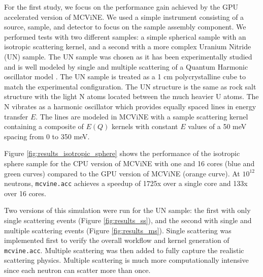 For the first study, we focus on the performance gain achieved by the GPU accelerated version of MCViNE.
We used a simple instrument consisting of a source, sample, and detector to focus on the sample assembly component. 
We performed tests with two different samples: a simple spherical sample with an isotropic scattering kernel, and a second with a more complex Uranium Nitride (UN) sample.
The UN sample was chosen as it has been experimentally studied and is well modeled by single and multiple scattering of a Quantum Harmonic oscillator model \cite{aczel2012quantum,lin2014UN}.
The UN sample is treated as a 1 cm polycrystalline cube to match the experimental configuration\cite{aczel2012quantum}. 
The UN structure is the same as  rock salt structure with the light N atoms located between the much heavier U atoms.  
The N vibrates as a harmonic oscillator which provides equally spaced lines in energy transfer $E$.
The lines are modeled in MCViNE with a sample scattering kernel containing a composite of $E(Q)$ kernels with constant $E$ values of a 50 meV spacing from 0 to 350 meV.

Figure \ref{fig:results_isotropic_sphere} shows the performance of the isotropic sphere sample for the CPU version of MCViNE with one and 16 cores (blue and green curves) compared to the GPU version of MCViNE (orange curve). At $10^{12}$ neutrons, \texttt{mcvine.acc} achieves a speedup of 1725x over a single core and 133x over 16 cores.


Two versions of this simulation were run for the UN sample: the first with only single scattering events (Figure \ref{fig:results_ss}), and the second with single and multiple scattering events (Figure \ref{fig:results_ms}).
Single scattering was implemented first to verify the overall workflow and kernel generation of \texttt{mcvine.acc}. Multiple scattering was then added to fully capture the realistic scattering physics.
Multiple scattering is much more computationally intensive since each neutron can scatter more than once.

